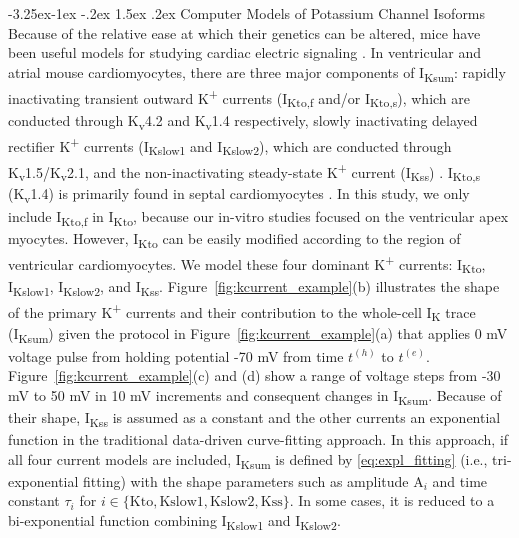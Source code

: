 \documentclass[11pt]{article}
\makeatletter
\renewcommand\subsection{\@startsection{subsection}{2}{\z@}%
                                     {-3.25ex\@plus -1ex \@minus -.2ex}%
                                     {1.5ex \@plus .2ex}%
                                     {\normalfont\fontfamily{phv}\fontsize{14}{17}\bfseries}}
\makeatother
\begin{document}
\subsection{Computer Models of Potassium Channel Isoforms}
Because of the relative ease at which their genetics can be altered, mice have been useful models for studying cardiac electric signaling \citep{milani2014small,nerbonne2004studying}. In ventricular and atrial mouse cardiomyocytes, there are three major components of I\textsubscript{Ksum}: rapidly inactivating transient outward K\textsuperscript{+} currents (I\textsubscript{Kto,f} and/or I\textsubscript{Kto,s}), which are conducted through K\textsubscript{v}4.2 and K\textsubscript{v}1.4 respectively, slowly inactivating delayed rectifier K\textsuperscript{+} currents (I\textsubscript{Kslow1} and I\textsubscript{Kslow2}), which are conducted through K\textsubscript{v}1.5/K\textsubscript{v}2.1, and the non-inactivating steady-state K\textsuperscript{+} current (I\textsubscript{Kss}) \citep{xu1999four}. I\textsubscript{Kto,s} (K\textsubscript{v}1.4) is primarily found in septal cardiomyocytes \citep{bondarenko2004computer}. In this study, we only include I\textsubscript{Kto,f} in I\textsubscript{Kto}, because our in-vitro studies focused on the ventricular apex myocytes. However, I\textsubscript{Kto} can be easily modified according to the region of ventricular cardiomyocytes. We model these four dominant K\textsuperscript{+} currents: I\textsubscript{Kto}, I\textsubscript{Kslow1}, I\textsubscript{Kslow2}, and I\textsubscript{Kss}. Figure~\ref{fig:kcurrent_example}(b) illustrates the shape of the primary K\textsuperscript{+} currents and their contribution to the whole-cell I\textsubscript{K} trace (I\textsubscript{Ksum}) given the protocol in Figure~\ref{fig:kcurrent_example}(a) that applies 0 mV voltage pulse from holding potential -70 mV from time $t^{(h)}$ to $t^{(e)}$. Figure~\ref{fig:kcurrent_example}(c) and (d) show a range of voltage steps from -30 mV to 50 mV in 10 mV increments and consequent changes in I\textsubscript{Ksum}. Because of their shape, I\textsubscript{Kss} is assumed as a constant and the other currents an exponential function in the traditional data-driven curve-fitting approach. In this approach, if all four current models are included, I\textsubscript{Ksum} is defined by \eqref{eq:expl_fitting} (i.e., tri-exponential fitting) with the shape parameters such as amplitude $\mathrm{A}_{i}$ and time constant $\tau_{i}$ for $i \in \{\mathrm{Kto}, \mathrm{Kslow1}, \mathrm{Kslow2}, \mathrm{Kss}\}$. In some cases, it is reduced to a bi-exponential function combining I\textsubscript{Kslow1} and I\textsubscript{Kslow2}. 
\end{document}
